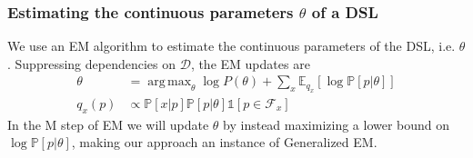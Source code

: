 \documentclass{article}
\DeclareMathOperator*{\argmax}{arg\,max} %
\newcommand{\indicator}{\mathds{1}} %
\newcommand{\expect}{\mathds{E}} %
\newcommand{\probability}{\mathds{P}} %
\begin{document}
\subsubsection{Estimating the continuous parameters $\theta$ of a DSL}\label{mapAppendix}
We use an EM algorithm to estimate the continuous parameters of the DSL, i.e. $\theta$.
Suppressing dependencies on $\mathcal{D}$, the EM updates are
\begin{align}
\label{maximizeStep}  \theta& = \argmax_\theta \log P(\theta) + \sum_x \expect_{q_x}\left[\log \probability\left[p|\theta \right] \right]\\
  q_x(p)&\propto \probability[x|p]\probability[p|\theta]\indicator\left[p\in \mathcal{F}_x \right]
\end{align}
In the M step of EM we will update $\theta$ by instead maximizing a lower bound on $\log \probability[p|\theta]$,
making our approach an instance of Generalized EM.
\end{document}
